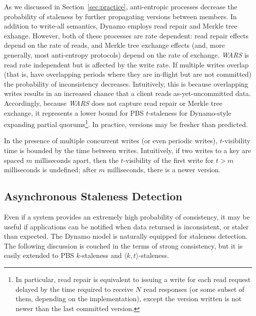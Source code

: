 \documentclass{vldb}
\newcommand{\subsectionskip}{-0em}
\begin{document}
As we discussed in Section~\ref{sec:practice}, anti-entropic processes
decrease the probability of staleness by further propagating versions
between members.  In addition to write-all semantics, Dynamo employs
read repair and Merkle tree exhange. However, both of these processes
are rate dependent: read repair effects depend on the rate of reads,
and Merkle tree exchange effects (and, more generally, most
anti-entropy protocols) depend on the rate of exchange.  \textit{WARS}
is read rate independent but is affected by the write rate.  If
multiple writes overlap (that is, have overlapping periods where they
are in-flight but are not committed) the probability of inconsistency
decreases.  Intuitively, this is because overlapping writes results in
an increased chance that a client reads as-yet-uncommitted data.
Accordingly, because \textit{WARS} does not capture read repair or
Merkle tree exchange, it represents a lower bound for PBS
$t$-staleness for Dynamo-style expanding partial quorums\footnote{In
  particular, read repair is equivalent to issuing a write
  for each read request delayed by the time required to receive $N$
  read responses (or some subset of them, depending on the
  implementation), except the version written is not newer than the
  last committed version.}. In practice, versions may be fresher than
predicted.

In the presence of multiple concurrent writes (or even periodic
writes), $t$-visibility time is bounded by the time between writes.
Intuitively, if two writes to a key are spaced $m$ milliseconds apart,
then the $t$-visibility of the first write for $t > m$ milliseconds is
undefined; after $m$ milliseconds, there is a newer version.

\vspace{\subsectionskip}\subsection{Asynchronous Staleness Detection}

Even if a system provides an extremely high probability of
consistency, it may be useful if applications can be notified when
data returned is inconsistent, or staler than expected.  The Dynamo
model is naturally equipped for staleness detection.  The following
discussion is couched in the terms of strong consistency, but it is
easily extended to PBS $k$-staleness and $\langle k, t
\rangle$-staleness.
\end{document}
